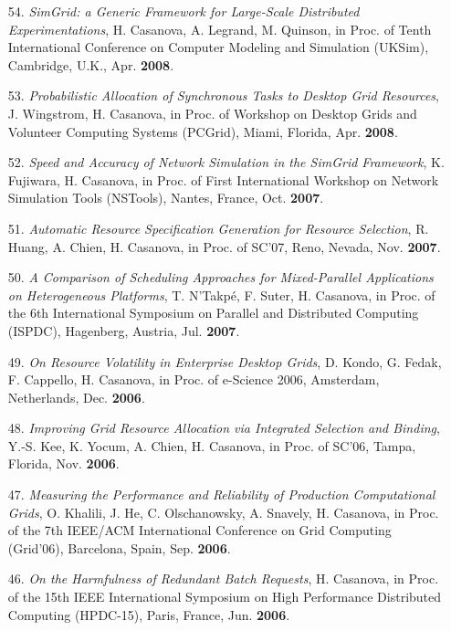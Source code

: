 \begin{enumerate}
\item[54.] {\it SimGrid: a Generic Framework for Large-Scale Distributed Experimentations}, H. Casanova, A. Legrand, M. Quinson, in Proc. of Tenth International Conference on Computer Modeling and Simulation (UKSim), Cambridge, U.K., Apr. {\bf 2008}.

\item[53.] {\it Probabilistic Allocation of Synchronous Tasks to Desktop Grid
Resources}, J. Wingstrom, H. Casanova, in Proc. of Workshop on Desktop
Grids and Volunteer Computing Systems (PCGrid), Miami, Florida, Apr. {\bf
2008}.

\item[52.] {\it Speed and Accuracy of Network Simulation in the SimGrid
Framework}, K. Fujiwara, H. Casanova, in Proc. of First International
Workshop on Network Simulation Tools (NSTools), Nantes, France, Oct. {\bf
2007}.

\item[51.] {\it Automatic Resource Specification Generation for Resource
Selection},  R. Huang, A. Chien, H. Casanova, in Proc. of SC'07, Reno,
Nevada, Nov. {\bf 2007}.

\item[50.] {\it A Comparison of Scheduling Approaches for Mixed-Parallel Applications on Heterogeneous Platforms},  T. N'Takp\'e, F. Suter, H. Casanova, in Proc. of the 6th International Symposium on Parallel and Distributed Computing (ISPDC), Hagenberg, Austria, 
Jul. {\bf 2007}.

\item[49.] {\it On Resource Volatility in Enterprise Desktop Grids}, D. Kondo, G. Fedak, F. Cappello, H. Casanova, in Proc. of e-Science 2006, Amsterdam,
Netherlands, Dec. {\bf 2006}.

\item[48.] {\it Improving Grid Resource Allocation via Integrated Selection and
Binding}, Y.-S. Kee, K. Yocum, A. Chien, H. Casanova, in Proc. of SC'06,
Tampa, Florida, Nov. {\bf 2006}.

\item[47.] {\it Measuring the Performance and Reliability of Production
Computational Grids}, O. Khalili, J. He, C. Olschanowsky, A. Snavely, H.
Casanova, in Proc. of the 7th IEEE/ACM International Conference on Grid
Computing (Grid'06), Barcelona, Spain, Sep. {\bf 2006}.

\item[46.] {\it On the Harmfulness of Redundant Batch Requests}, H.
Casanova, in Proc. of the 15th IEEE International Symposium on High
Performance Distributed Computing (HPDC-15), Paris, France, Jun. {\bf
2006}.


\end{enumerate}

